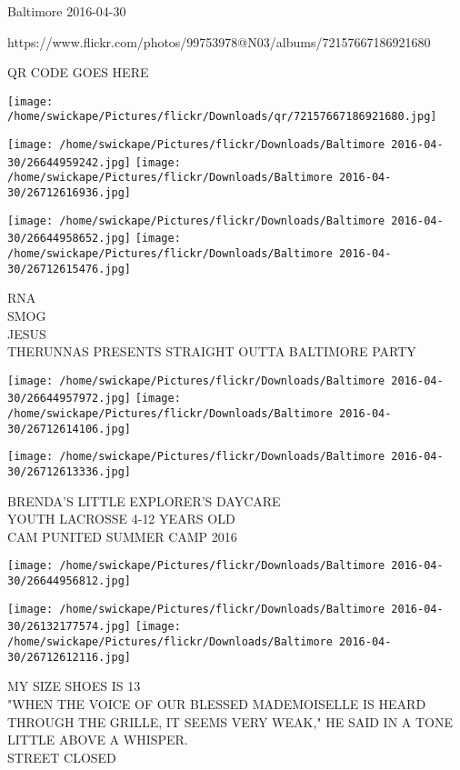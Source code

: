 \documentclass[10pt,letterpaper]{article}
\begin{document}
Baltimore 2016-04-30

https://www.flickr.com/photos/99753978@N03/albums/72157667186921680

QR CODE GOES HERE

\texttt{[image: /home/swickape/Pictures/flickr/Downloads/qr/72157667186921680.jpg]}
\pagebreak

\texttt{[image: /home/swickape/Pictures/flickr/Downloads/Baltimore 2016-04-30/26644959242.jpg]}
\texttt{[image: /home/swickape/Pictures/flickr/Downloads/Baltimore 2016-04-30/26712616936.jpg]}

\texttt{[image: /home/swickape/Pictures/flickr/Downloads/Baltimore 2016-04-30/26644958652.jpg]}
\texttt{[image: /home/swickape/Pictures/flickr/Downloads/Baltimore 2016-04-30/26712615476.jpg]}

RNA\\
SMOG\\
JESUS\\
THERUNNAS PRESENTS STRAIGHT OUTTA BALTIMORE PARTY\\
\pagebreak

\texttt{[image: /home/swickape/Pictures/flickr/Downloads/Baltimore 2016-04-30/26644957972.jpg]}
\texttt{[image: /home/swickape/Pictures/flickr/Downloads/Baltimore 2016-04-30/26712614106.jpg]}

\texttt{[image: /home/swickape/Pictures/flickr/Downloads/Baltimore 2016-04-30/26712613336.jpg]}

BRENDA'S LITTLE EXPLORER'S DAYCARE\\
YOUTH LACROSSE 4{-}12 YEARS OLD\\
CAM PUNITED SUMMER CAMP 2016\\
\pagebreak

\texttt{[image: /home/swickape/Pictures/flickr/Downloads/Baltimore 2016-04-30/26644956812.jpg]}

\vspace{0.25in}
\texttt{[image: /home/swickape/Pictures/flickr/Downloads/Baltimore 2016-04-30/26132177574.jpg]}
\texttt{[image: /home/swickape/Pictures/flickr/Downloads/Baltimore 2016-04-30/26712612116.jpg]}

MY SIZE SHOES IS 13\\
"WHEN THE VOICE OF OUR BLESSED MADEMOISELLE IS HEARD THROUGH THE GRILLE, IT SEEMS VERY WEAK," HE SAID IN A TONE LITTLE ABOVE A WHISPER.\\
STREET CLOSED\\
\pagebreak
\end{document}
